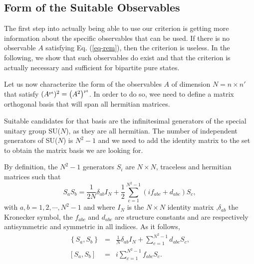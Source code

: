 
\subsection{Form of the Suitable Observables}

The first step into actually being able to use our criterion is getting more information about the specific observables that can be used. If there is no observable $A$ satisfying Eq. (\ref{eq-rem}), then the criterion is useless. In the following, we show that such observables do exist and that the criterion is actually necessary and sufficient for bipartite pure states.

Let us now characterize the form of the observables $A$ of dimension $N=n\times n'$ that satisfy $(A^{\mbox{\tiny \textup{pt}}})^2 = \left(A^2 \right)^{\mbox{\tiny \textup{pt}}}$. In order to do so, wee need to define a matrix orthogonal basis that will span all hermitian matrices.

Suitable candidates for that basis are the infinitesimal generators of the special unitary group SU($N$), as they are all hermitian. The number of independent generators of SU($N$) is $N^2-1$ and we need to add the identity matrix to the set to obtain the matrix basis we are looking for.

By definition, the $N^2-1$ generators $S_i$ are $N\times N$, traceless and hermitian matrices such that
\[ S_a S_b = \frac{1}{2N}\delta_{ab}I_N + \frac{1}{2}\sum_{c=1}^{N^2 -1}{(if_{abc} + d_{abc}) S_c},  \]
with $a,b=1,2,\cdots, N^2-1$ and where $I_N$ is the $N\times N$ identity matrix ,$\delta_{ab}$ the Kronecker symbol, the $f_{abc} $ and $d_{abc}$ are structure constants and are respectively antisymmetric and symmetric in all indices. As it follows,
\begin{eqnarray}
  \left\{S_a, S_b\right\} &=&\frac{1}{N}\delta_{ab} I_N+ \sum_{c=1}^{N^2 -1}{d_{abc} S_c}, \\
  \left[S_a, S_b \right] &=& i \sum_{c=1}^{N^2 -1}{f_{abc} S_c}. \label{eq-Scomm}
\end{eqnarray}

